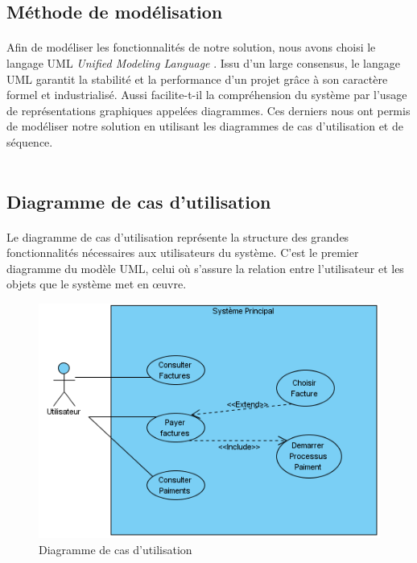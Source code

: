 \subsection{Méthode de modélisation}
      \paragraph{}
      Afin de modéliser les fonctionnalités de notre solution, nous avons choisi le langage UML \textit{Unified Modeling Language} \cite{I}. Issu d’un large consensus, le langage UML garantit la stabilité et la performance d’un projet grâce à son caractère formel et industrialisé. Aussi facilite-t-il la compréhension du système par l’usage de représentations graphiques appelées diagrammes. Ces derniers nous ont permis de modéliser notre solution en utilisant les diagrammes de cas d’utilisation et de séquence.\\ \\
\subsection{Diagramme de cas d'utilisation}
    \paragraph{}
	  Le diagramme de cas d'utilisation représente la structure des grandes fonctionnalités nécessaires aux utilisateurs du système. C'est le premier diagramme du modèle UML, celui où s'assure la relation entre l'utilisateur et les objets que le système met en œuvre. 

	  \begin{figure}[H]
		     \begin{center}
			\includegraphics[scale=0.5]{images/uc.png}
		     \end{center}
		     \caption{Diagramme de cas d'utilisation}
		     \label{Diagramme de cas d'utilisation}
	  \end{figure}
	  
